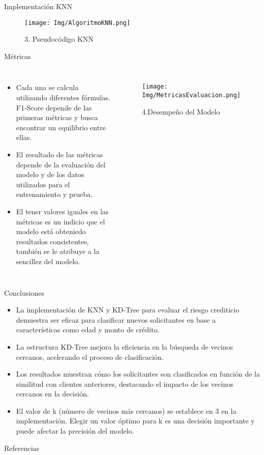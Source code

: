 \documentclass [xcolor=svgnames, t] {beamer}
\begin{document}
\begin{frame}{Implementación KNN\autocite{Alpaydin2014IntroML}}
\begin{figure}
    \centering
    \texttt{[image: Img/AlgoritmoKNN.png]}
    \caption{3. Pseudocódigo KNN}
\end{figure} 
\end{frame}


\begin{frame}{Métricas}
    \begin{center}    
    \begin{columns}[onlytextwidth,T]
    \begin{itemize}
        \item Cada una se calcula utilizando diferentes fórmulas. F1-Score depende de las primeras métricas y busca encontrar un equilibrio entre ellas. 
       \item El resultado de las métricas depende de la evaluación del modelo y de los datos utilizados para el entrenamiento y prueba. 
       \item El tener valores iguales en las métricas es un indicio que el modelo está obteniedo resultados consistentes, también se le atribuye a la sencillez del modelo.
    \end{itemize} 

    \begin{figure}
        \centering
        \texttt{[image: Img/MetricasEvaluacion.png]}
        \caption{4.Desempeño del Modelo}
    \end{figure}
\end{columns}
\end{center} 
\end{frame}


\begin{frame}{Conclusiones}

\begin{itemize}
    \item La implementación de KNN y KD-Tree para evaluar el riesgo crediticio demuestra ser eficaz para clasificar nuevos solicitantes en base a características como edad y monto de crédito.
    \item La estructura KD-Tree mejora la eficiencia en la búsqueda de vecinos cercanos, acelerando el proceso de clasificación.
    \item Los resultados muestran cómo los solicitantes son clasificados en función de la similitud con clientes anteriores, destacando el impacto de los vecinos cercanos en la decisión.
     \item El valor de k (número de vecinos más cercanos) se establece en 3 en la implementación. Elegir un valor óptimo para k es una decisión importante y puede afectar la precisión del modelo.
\end{itemize}    
\end{frame}
\begin{frame}{Referencias}
   \printbibliography
\end{frame}
\end{document}
